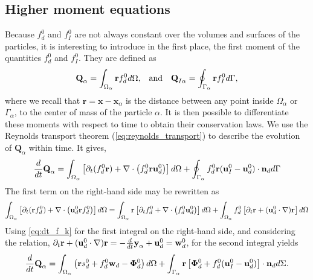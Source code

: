\subsection{Higher moment equations}

Because $f_d^0$ and $f_I^0$ are not always constant over the volumes and surfaces of the particles, it is interesting to introduce in the first place, the first moment of the quantities $f_d^0$ and $f_I^0$. 
They are defined as
\begin{align}
    &\textbf{Q}_\alpha 
    = \int_{\Omega_\alpha}  \textbf{r} f_d^0  d\Omega,
    &\text{and}&
    &\textbf{Q}_{I\alpha}
    = \oint_{\Gamma_\alpha}  \textbf{r} f_I^0  d\Gamma,
    \label{eq:first_moment_definition}
\end{align}
where we recall that $\textbf{r} = \textbf{x} - \textbf{x}_\alpha$ is the distance between any point inside $\Omega_\alpha$ or $\Gamma_\alpha$, to the center of mass of the particle $\alpha$.
It is then possible to differentiate these moments with respect to time to obtain their conservation laws.
We use the Reynolds transport theorem (\ref{eq:reynolds_transport}) to describe the evolution of $\textbf{Q}_\alpha$ within time. 
It gives, 
\begin{equation*}
    \frac{d}{dt} \textbf{Q}_\alpha
      =  \int_{\Omega_\alpha} \left[
        \partial_t(  f_d^0\textbf{r})
        + \mathbf{\nabla}\cdot \left(  f_d^0 \textbf{r}\textbf{u}_d^0\right)
    \right] d\Omega 
    + \oint_{\Gamma_\alpha}   f_d^0 \textbf{r}  (\textbf{u}_I^0-\textbf{u}_d^0)\cdot \textbf{n}_d d\Gamma
\end{equation*}
The first term on the right-hand side may be rewritten as
\begin{equation*}
\int_{\Omega_\alpha}  \left[
        \partial_t(\textbf{r}  f_d^0)+ \mathbf{\nabla}\cdot \left( \textbf{u}_d^0 \textbf{r} f^0_d\right) 
    \right] d\Omega
    = \int_{\Omega_\alpha} \textbf{r}\left[
        \partial_t f_d^0
        + \mathbf{\nabla}\cdot \left(f_d^0 \textbf{u}_d^0\right)
    \right]  d\Omega
    + \int_{\Omega_\alpha}  f_d^0 \left[
        \partial_t \textbf{r}
        +(\textbf{u}_d^0 \cdot \mathbf{\nabla}) \textbf{r}
    \right] d\Omega
\end{equation*}
Using \ref{eq:dt_f_k} for the first integral on the right-hand side, and considering the relation,
$  \partial_t \textbf{r}
+ (\textbf{u}_d^0 \cdot \mathbf{\nabla}) \textbf{r}
= - \frac{d}{dt} \textbf{y}_\alpha  + \textbf{u}_d^0 
= \textbf{w}_d^0$,
for the second integral yields 
\begin{align}
    \frac{d}{dt} \textbf{Q}_\alpha
    = \int_{\Omega_\alpha} \left( 
        \textbf{r} s_d^0  
        + f_d^0  \textbf{w}_d 
        - \bm\Phi_d^0
    \right)  d\Omega
    + \int_{\Gamma_\alpha} \textbf{r} \left[
        \bm\Phi_d^0
        + f_d^0 (\textbf{u}_I^0-\textbf{u}_d^0)
    \right]\cdot \textbf{n}_d  d\Sigma.
    \label{eq:dt_Q_alpha}
\end{align}
